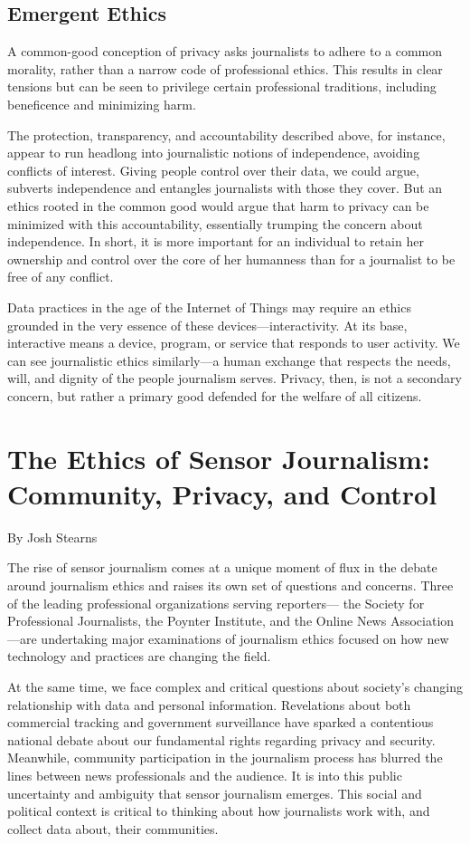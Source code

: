 \begin{itemize}
\section{Emergent Ethics}
A common-good conception of privacy asks journalists to adhere to a common
morality, rather than a narrow code of professional ethics. This results
in clear tensions but can be seen to privilege certain professional traditions,
including beneficence and minimizing harm.

The protection, transparency, and accountability described above, for
instance, appear to run headlong into journalistic notions of independence,
avoiding conflicts of interest. Giving people control over their data, we
could argue, subverts independence and entangles journalists with those
they cover. But an ethics rooted in the common good would argue that harm
to privacy can be minimized with this accountability, essentially trumping the concern about independence. In short, it is more important for an individual
to retain her ownership and control over the core of her humanness
than for a journalist to be free of any conflict.

Data practices in the age of the Internet of Things may require an ethics
grounded in the very essence of these devices—interactivity. At its base,
interactive means a device, program, or service that responds to user
activity. We can see journalistic ethics similarly—a human exchange that
respects the needs, will, and dignity of the people journalism serves. Privacy,
then, is not a secondary concern, but rather a primary good defended
for the welfare of all citizens.

\chapter{The Ethics of Sensor Journalism: Community, Privacy, and Control}
By Josh Stearns

The rise of sensor journalism comes at a unique moment of flux in the
debate around journalism ethics and raises its own set of questions and
concerns. Three of the leading professional organizations serving reporters—
the Society for Professional Journalists, the Poynter Institute, and the
Online News Association—are undertaking major examinations of journalism
ethics focused on how new technology and practices are changing
the field.

At the same time, we face complex and critical questions about society's
changing relationship with data and personal information. Revelations
about both commercial tracking and government surveillance have sparked
a contentious national debate about our fundamental rights regarding privacy
and security. Meanwhile, community participation in the journalism
process has blurred the lines between news professionals and the audience.
It is into this public uncertainty and ambiguity that sensor journalism
emerges. This social and political context is critical to thinking about how
journalists work with, and collect data about, their communities.


\end{itemize}
